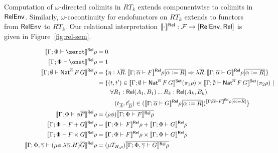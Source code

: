 \documentclass[runningheads]{llncs}
\newcommand{\F}{\mathcal{F}}
\begin{document}
Computation of $\omega$-directed colimits in $RT_k$ extends
componentwise to colimits in $\mathsf{RelEnv}$. Similarly,
$\omega$-cocontinuity for endofunctors on $RT_k$ extends to
functors from $\mathsf{RelEnv}$ to $RT_k$.
Our relational interpretation $\relsem{\cdot} : \F \to [\relenv,
\rel]$ is given in Figure~\ref{fig:rel-sem}.
\begin{figure}[t]
\begin{adjustbox}{varwidth=5in, max width=5in, fbox, center}
  \begin{align*}
  \relsem{\Gamma;\Phi \vdash \zerot}\rho &= 0\\
  \relsem{\Gamma;\Phi \vdash \onet}\rho &= 1\\
  \relsem{\Gamma; \emptyset \vdash \Nat^{\ol{\alpha}} \,F\,G}\rho &= \{\eta
  : \lambda \ol{R}.\,\relsem{\Gamma; \ol{\alpha} \vdash
    F}\rho[\ol{\alpha := R}] \Rightarrow \lambda \ol{R}. \,\relsem{
    \Gamma; \ol{\alpha} \vdash G}\rho[\ol{\alpha := R}]\}\\
  &=
  \{(t,t') \in \setsem{\Gamma; \emptyset
    \vdash \Nat^{\ol{\alpha}}
    \,F\,G} (\pi_1 \rho) \times \setsem{ 
    \Gamma;\emptyset
    \vdash \Nat^{\ol{\alpha}} \,F\,G} (\pi_2
  \rho)~|~\\ 
  & \hspace{0.3in} \forall {R_1 : \rel(A_1,B_1)}\,...\,{R_k : \rel(A_k,B_k)}.\\
  & \hspace{0.4in} (t_{\ol{A}},t'_{\ol{B}}) \in
  (\relsem{\Gamma; \ol{\alpha} \vdash G}\rho[\ol{\alpha :=
      R}])^{\relsem{\Gamma;\ol{\alpha}\vdash F}\rho[\ol{\alpha := R}]} \}\\  
  \relsem{\Gamma;\Phi \vdash \phi \ol{F}}\rho &=
  (\rho\phi)\ol{\relsem{\Gamma;\Phi \vdash 
    F}\rho}\\
  \relsem{\Gamma;\Phi \vdash F+G}\rho &=
  \relsem{\Gamma;\Phi \vdash F}\rho +
  \relsem{\Gamma;\Phi \vdash G}\rho\\
  \relsem{\Gamma;\Phi \vdash F\times G}\rho &=
  \relsem{\Gamma;\Phi \vdash F}\rho \times
  \relsem{\Gamma;\Phi \vdash G}\rho\\  
   \relsem{\Gamma;\Phi,\ol\gamma \vdash (\mu \phi.\lambda
    \ol{\alpha}. H)\ol{G}}\rho
  &= (\mu T_{H,\rho})\ol{\relsem{\Gamma;\Phi,\ol\gamma \vdash
     G}\rho}\\

\end{align*}
\end{adjustbox}
\end{figure}
\end{document}
